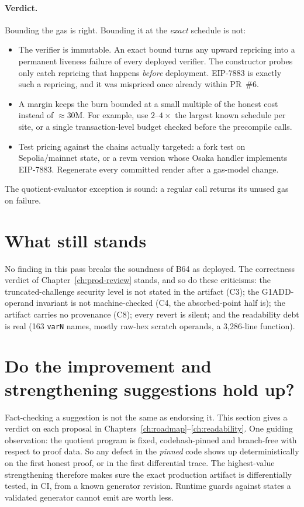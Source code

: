 \paragraph{Verdict.} Bounding the gas is right. Bounding it at the
\emph{exact} schedule is not:
\begin{itemize}[leftmargin=1.4em,itemsep=2pt]
\item The verifier is immutable. An exact bound turns any upward
  repricing into a permanent liveness failure of every deployed
  verifier. The constructor probes only catch repricing that happens
  \emph{before} deployment. EIP-7883 is exactly such a repricing, and it
  was mispriced once already within PR~\#6.
\item A margin keeps the burn bounded at a small multiple of the honest
  cost instead of $\approx$30M. For example, use $2$--$4\times$ the
  largest known schedule per site, or a single transaction-level budget
  checked before the precompile calls.
\item Test pricing against the chains actually targeted: a fork test on
  Sepolia/mainnet state, or a revm version whose Osaka handler implements
  EIP-7883. Regenerate every committed render after a gas-model change.
\end{itemize}
The quotient-evaluator exception is sound: a regular call returns its
unused gas on failure.

\section{What still stands}
\label{sec:vp-stands}

No finding in this pass breaks the soundness of B64 as deployed. The
correctness verdict of Chapter~\ref{ch:prod-review} stands, and so do these
criticisms: the truncated-challenge security level is not stated in the
artifact (C3); the G1ADD-operand invariant is not machine-checked (C4, the
absorbed-point half is); the artifact carries no provenance (C8); every
revert is silent; and the readability debt is real (163 \texttt{varN}
names, mostly raw-hex scratch operands, a 3{,}286-line function).

\section{Do the improvement and strengthening suggestions hold up?}
\label{sec:vp-opinion}

Fact-checking a suggestion is not the same as endorsing it. This section
gives a verdict on each proposal in Chapters~\ref{ch:roadmap}--\ref{ch:readability}.
One guiding observation: the quotient program is fixed, codehash-pinned
and branch-free with respect to proof data. So any defect in the
\emph{pinned} code shows up deterministically on the first honest proof, or
in the first differential trace. The highest-value strengthening therefore
makes sure the exact production artifact is differentially tested, in CI,
from a known generator revision. Runtime guards against states a validated
generator cannot emit are worth less.

